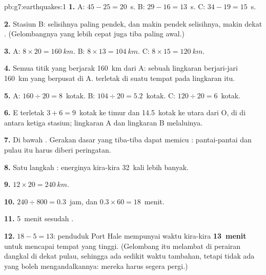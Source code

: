 \begin{solution}{pb:g7:earthquakes:1}
\textbf{1.} A: $45 - 25 = 20$~s. B: $29 - 16 = 13$~s. C: $34 - 19 =
15$~s.

\textbf{2.} Stasiun B: selisihnya paling pendek, dan makin pendek
selisihnya, makin dekat . (Gelombangnya yang lebih cepat juga
tiba paling awal.)

\textbf{3.} A: $8 \times 20 = \qty{160}{km}$. B: $8 \times 13 =
\qty{104}{km}$. C: $8 \times 15 = \qty{120}{km}$.

\textbf{4.} Semua titik yang berjarak \qty{160}{km} dari A: sebuah lingkaran
berjari-jari \qty{160}{km} yang berpusat di A.  terletak di suatu
tempat pada lingkaran itu.

\textbf{5.} A: $160 \div 20 = 8$~kotak. B: $104 \div 20 = 5.2$~kotak.
C: $120 \div 20 = 6$~kotak.

\textbf{6.} E terletak $3 + 6 = 9$~kotak ke timur dan 14.5~kotak ke utara
dari O, di  di antara ketiga stasiun; lingkaran A dan lingkaran B
melaluinya.

\textbf{7.} Di bawah . Gerakan dasar  yang tiba-tiba dapat memicu
: pantai-pantai dan pulau itu harus diberi peringatan.

\textbf{8.} Satu langkah : energinya kira-kira 32~kali lebih banyak.

\textbf{9.} $12 \times 20 = \qty{240}{km}$.

\textbf{10.} $240 \div 800 = 0.3$~jam, dan $0.3 \times 60 = 18$~menit.

\textbf{11.} 5~menit sesudah .

\textbf{12.} $18 - 5 = 13$: penduduk Port Hale mempunyai waktu kira-kira
\textbf{13~menit} untuk mencapai tempat yang tinggi. (Gelombang itu melambat
di perairan dangkal di dekat pulau, sehingga ada sedikit waktu tambahan,
tetapi tidak ada yang boleh mengandalkannya: mereka harus segera pergi.)
\end{solution}
